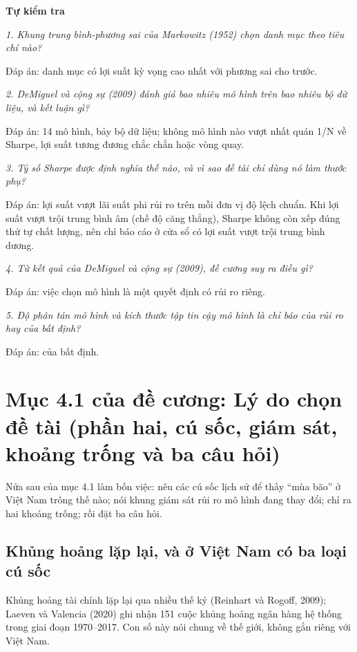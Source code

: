 \textbf{Tự kiểm tra}

{\itshape 1. Khung trung bình-phương sai của Markowitz (1952) chọn danh mục theo tiêu chí nào?\par}

Đáp án: danh mục có lợi suất kỳ vọng cao nhất với phương sai cho trước.

{\itshape 2. DeMiguel và cộng sự (2009) đánh giá bao nhiêu mô hình trên bao nhiêu bộ dữ liệu, và kết luận gì?\par}

Đáp án: 14 mô hình, bảy bộ dữ liệu; không mô hình nào vượt nhất quán 1/N về Sharpe, lợi suất tương đương chắc chắn hoặc vòng quay.

{\itshape 3. Tỷ số Sharpe được định nghĩa thế nào, và vì sao đề tài chỉ dùng nó làm thước phụ?\par}

Đáp án: lợi suất vượt lãi suất phi rủi ro trên mỗi đơn vị độ lệch chuẩn. Khi lợi suất vượt trội trung bình âm (chế độ căng thẳng), Sharpe không còn xếp đúng thứ tự chất lượng, nên chỉ báo cáo ở cửa sổ có lợi suất vượt trội trung bình dương.

{\itshape 4. Từ kết quả của DeMiguel và cộng sự (2009), đề cương suy ra điều gì?\par}

Đáp án: việc chọn mô hình là một quyết định có rủi ro riêng.

{\itshape 5. Độ phân tán mô hình và kích thước tập tin cậy mô hình là chỉ báo của rủi ro hay của bất định?\par}

Đáp án: của bất định.

\chapter{Mục 4.1 của đề cương: Lý do chọn đề tài (phần hai, cú sốc, giám sát, khoảng trống và ba câu hỏi)}

Nửa sau của mục 4.1 làm bốn việc: nêu các cú sốc lịch sử để thấy “mùa bão” ở Việt Nam trông thế nào; nói khung giám sát rủi ro mô hình đang thay đổi; chỉ ra hai khoảng trống; rồi đặt ba câu hỏi.

\section{Khủng hoảng lặp lại, và ở Việt Nam có ba loại cú sốc}

Khủng hoảng tài chính lặp lại qua nhiều thế kỷ (Reinhart và Rogoff, 2009); Laeven và Valencia (2020) ghi nhận 151 cuộc khủng hoảng ngân hàng hệ thống trong giai đoạn 1970--2017. Con số này nói chung về thế giới, không gắn riêng với Việt Nam.

